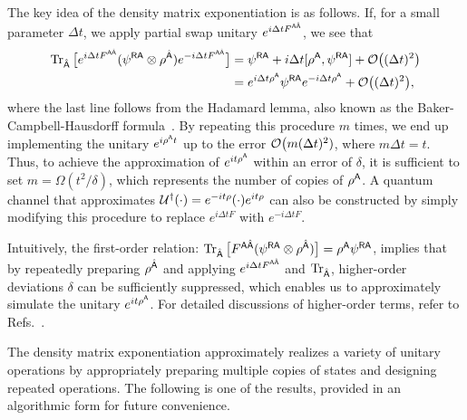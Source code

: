 The key idea of the density matrix exponentiation is as follows.
If, for a small parameter $\Delta t$, we apply partial swap unitary $e^{i\Delta t F^{{\mathsf{A}}\hat{{\mathsf{A}}}}}$, we see that
\begin{align}
    \operatorname{Tr}_{\hat{{\mathsf{A}}}}\big[e^{i\Delta t F^{{\mathsf{A}}\hat{{\mathsf{A}}}}} (\psi^{{\mathsf{R}}{\mathsf{A}}} \otimes \rho^{\hat{{\mathsf{A}}}}) e^{-i\Delta t F^{{\mathsf{A}}\hat{{\mathsf{A}}}}}\big] 
    &= \psi^{{\mathsf{R}}{\mathsf{A}}} + i\Delta t [\rho^{\mathsf{A}}, \psi^{{\mathsf{R}}{\mathsf{A}}}] + {\mathcal{O}}\big((\Delta t)^2\big) \\ 
    &= e^{i\Delta t\rho^{\mathsf{A}}} \psi^{{\mathsf{R}}{\mathsf{A}}} e^{-i\Delta t \rho^{\mathsf{A}}} + {\mathcal{O}}\big((\Delta t)^2\big),
\end{align}
where the last line follows from the Hadamard lemma, also known as the Baker-Campbell-Hausdorff formula~\cite{campbell1896BCHlemma, Baker1901BCHlemma, hausdorff1906symbolische, dynkin1947calculation}.
By repeating this procedure $m$ times, we end up implementing the unitary $e^{i\rho^{\mathsf{A}} t}$ up to the error ${\mathcal{O}}\big(m(\Delta t)^2)$, where $m \Delta t = t$. 
Thus, to achieve the approximation of $e^{it\rho^{\mathsf{A}}}$ within an error of $\delta$, it is sufficient to set $m = \Omega(t^2/\delta)$, which represents the number of copies of $\rho^{\mathsf{A}}$.
A quantum channel that approximates ${\mathcal{U}}^\dag(\cdot) = e^{-it\rho}(\cdot)e^{it\rho}$ can also be constructed by simply modifying this procedure to replace $e^{i\Delta t F}$ with $e^{-i\Delta t F}$.


Intuitively, the first-order relation: $\operatorname{Tr}_{\hat{{\mathsf{A}}}}\big[F^{{\mathsf{A}}\hat{{\mathsf{A}}}}(\psi^{{\mathsf{R}}{\mathsf{A}}}\otimes\rho^{\hat{{\mathsf{A}}}})\big] = \rho^{\mathsf{A}}\psi^{{\mathsf{R}}{\mathsf{A}}}$, implies that by repeatedly preparing $\rho^{\hat{{\mathsf{A}}}}$ and applying $e^{i\Delta t F^{{\mathsf{A}}\hat{{\mathsf{A}}}}}$ and $\operatorname{Tr}_{\hat{{\mathsf{A}}}}$, higher-order deviations $\delta$ can be sufficiently suppressed, which enables us to approximately simulate the unitary $e^{it\rho^{\mathsf{A}}}$.
For detailed discussions of higher-order terms, refer to Refs.~\cite{wei2023DMEhermitianpreserv, go2024DMEsamplebased}.



The density matrix exponentiation approximately realizes a variety of unitary operations by appropriately preparing multiple copies of states and designing repeated operations.
The following is one of the results, provided in an algorithmic form for future convenience.


